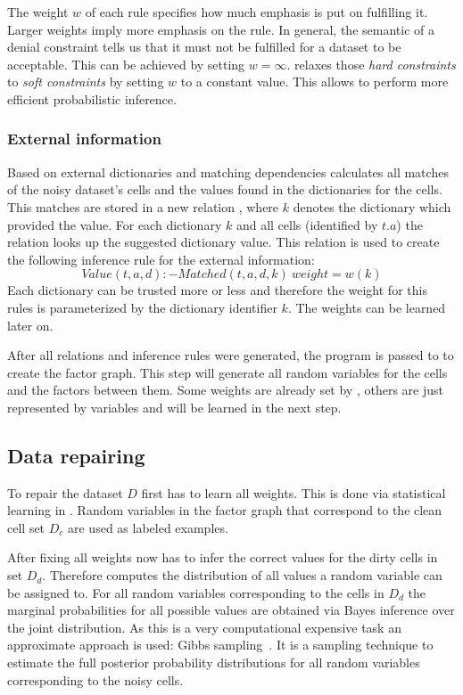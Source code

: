   The weight $w$ of each rule specifies how much emphasis is put on fulfilling it.
  Larger weights imply more emphasis on the rule.
  In general, the semantic of a denial constraint tells us that it must not be fulfilled for a dataset to be acceptable.
  This can be achieved by setting $w=\infty$.
  \holoclean{} relaxes those \textit{hard constraints} to \textit{soft constraints} by setting $w$ to a constant value.
  This allows \holoclean{} to perform more efficient probabilistic inference.
  
  \subsubsection*{External information}
  Based on external dictionaries and matching dependencies \holoclean{} calculates all matches of the noisy dataset's cells and the values found in the dictionaries for the cells.
  This matches are stored in a new relation , where $k$ denotes the dictionary which provided the value.
  For each dictionary $k$ and all cells (identified by $t.a$) the relation  looks up the suggested dictionary value.
  This relation is used to create the following inference rule for the external information:
  \begin{equation}
    Value(t,a,d):-Matched(t,a,d,k)\ weight=w(k)\label{equ:matching}
  \end{equation}
  Each dictionary can be trusted more or less and therefore the weight for this rules is parameterized by the dictionary identifier $k$.
  The weights can be learned later on.
  
  \bigskip
  After all relations and inference rules were generated, the \ddlog{} program is passed to \deepdive{} to create the factor graph.
  This step will generate all random variables for the cells and the factors between them.
  Some weights are already set by \holoclean{}, others are just represented by variables and will be learned in the next step.
  
  \subsection{Data repairing}
  To repair the dataset $D$ \holoclean{} first has to learn all weights.
  This is done via statistical learning in \deepdive{}.
  Random variables in the factor graph that correspond to the clean cell set $D_c$ are used as labeled examples.
  
  After fixing all weights \holoclean{} now has to infer the correct values for the dirty cells in set $D_d$.
  Therefore \holoclean{} computes the distribution of all values a random variable can be assigned to.
  For all random variables corresponding to the cells in $D_d$ the marginal probabilities for all possible values are obtained via Bayes inference over the joint distribution.
  As this is a very computational expensive task an approximate approach is used: Gibbs sampling~\cite{gibbssampling}.
  It is a sampling technique to estimate the full posterior probability distributions for all random variables corresponding to the noisy cells.
  
